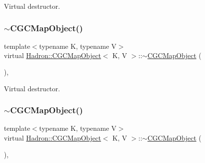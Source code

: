 Virtual destructor. 

\mbox{\label{classHadron_1_1CGCMapObject_aee79d26f143bad748680b674763b831f}} 
\subsubsection{\texorpdfstring{$\sim$CGCMapObject()}{~CGCMapObject()}\hspace{0.1cm}{\footnotesize\ttfamily [2/3]}}
{\footnotesize\ttfamily template$<$typename K, typename V$>$ \\
virtual \mbox{\hyperlink{classHadron_1_1CGCMapObject}{Hadron\+::\+C\+G\+C\+Map\+Object}}$<$ K, V $>$\+::$\sim$\mbox{\hyperlink{classHadron_1_1CGCMapObject}{C\+G\+C\+Map\+Object}} (\begin{DoxyParamCaption}{ }\end{DoxyParamCaption})\hspace{0.3cm}{\ttfamily [inline]}, {\ttfamily [virtual]}}



Virtual destructor. 

\mbox{\label{classHadron_1_1CGCMapObject_aee79d26f143bad748680b674763b831f}} 
\subsubsection{\texorpdfstring{$\sim$CGCMapObject()}{~CGCMapObject()}\hspace{0.1cm}{\footnotesize\ttfamily [3/3]}}
{\footnotesize\ttfamily template$<$typename K, typename V$>$ \\
virtual \mbox{\hyperlink{classHadron_1_1CGCMapObject}{Hadron\+::\+C\+G\+C\+Map\+Object}}$<$ K, V $>$\+::$\sim$\mbox{\hyperlink{classHadron_1_1CGCMapObject}{C\+G\+C\+Map\+Object}} (\begin{DoxyParamCaption}{ }\end{DoxyParamCaption})\hspace{0.3cm}{\ttfamily [inline]}, {\ttfamily [virtual]}}



